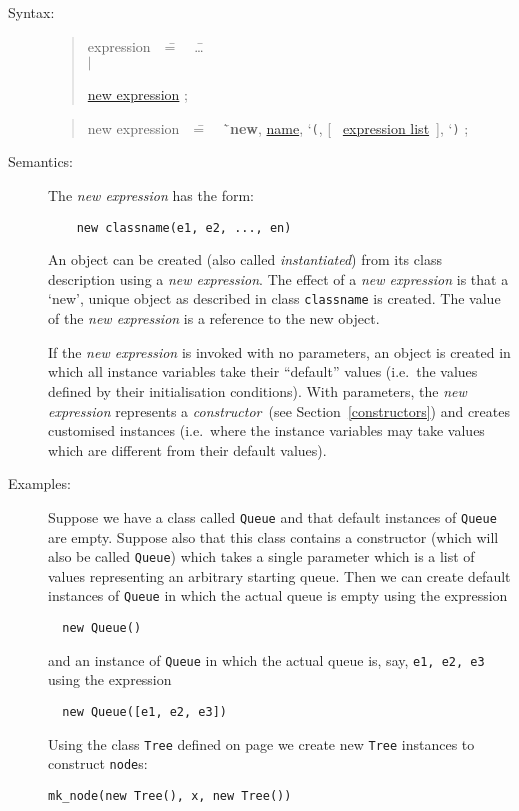 \documentclass{overturerepchap}
\newcommand{\Lit}[1]{`{\tt #1}\Quote}
\newcommand{\Rule}[2]{
  \begin{quote}\begin{tabbing}
    #1\index{#1}\ \ \= = \ \ \= #2  ; %
    
  \end{tabbing}\end{quote}
  }
\newcommand{\Ruleref}[1]{
  \hyperlink{rule:#1}{#1}}
\newcommand{\dsep}{\\ \> $|$ \>}
\newcommand{\Lop}[1]{`{\bf\ttfamily #1}\Quote}
\newcommand{\OptPt}[1]{[\ #1\ ]}
\begin{document}
\begin{description}
\item[Syntax:] 
  \Rule{expression}{
    \ldots \dsep
    \Ruleref{new expression} 
    }
  \Rule{new expression}{
    \Lop{new}, \Ruleref{name}, \Lit{(}, \OptPt{\Ruleref{expression list}}, \Lit{)}
  }

\item[Semantics:] The {\it new expression} has the form:

  \begin{lstlisting}
    new classname(e1, e2, ..., en)
  \end{lstlisting}
  An object can be created (also called {\em instantiated}) from its
  class description using a {\it new expression}. The effect of a
  {\it new expression} is that a `new', unique object as described in
  class {\tt classname} is created. The value of the {\it new
  expression} is a reference to the new object.

  If the {\it new expression} is invoked with no parameters, an
  object is created in which all instance variables take their
  ``default'' values (i.e.\ the values defined by their initialisation
  conditions). With parameters, the {\it new expression} represents a
  \emph{constructor}~(see Section~\ref{constructors}) and creates
  customised instances (i.e.\ where the instance variables may take
  values which are different from their default values).


\item[Examples:] Suppose we have a class called \texttt{Queue} and
  that default instances of \texttt{Queue} are empty. Suppose also
  that this class contains a constructor (which will also be called
  \texttt{Queue}) which takes a single parameter which is a list of
  values representing an arbitrary starting queue. Then we can 
  create default  instances of \texttt{Queue} in which the actual
  queue is empty using the expression
\begin{lstlisting}
  new Queue()
\end{lstlisting}
and an instance of \texttt{Queue} in which the actual
  queue is, say, \texttt{e1, e2, e3} using the expression
\begin{lstlisting}
  new Queue([e1, e2, e3])
\end{lstlisting}

Using the class \texttt{Tree} defined on page \pageref{TreeDef} we create
new \texttt{Tree} instances to construct \texttt{node}s:
\begin{lstlisting}
mk_node(new Tree(), x, new Tree())
\end{lstlisting}
    

\end{description}
\end{document}
